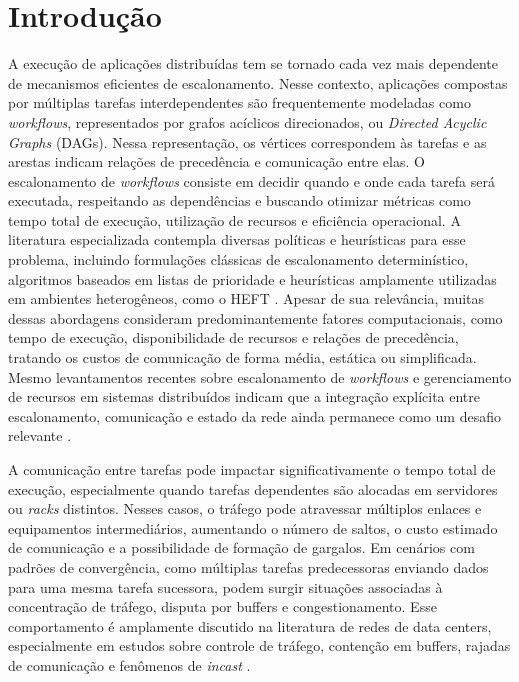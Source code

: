 \documentclass[12pt]{article}
\begin{document}
\section{Introdução}
\label{sec:introduction}

A execução de aplicações distribuídas tem se tornado cada vez mais dependente de mecanismos eficientes de escalonamento. 
%
Nesse contexto, aplicações compostas por múltiplas tarefas interdependentes são frequentemente modeladas como \textit{workflows}, representados por grafos acíclicos direcionados, ou \textit{Directed Acyclic Graphs} (DAGs). 
%
Nessa representação, os vértices correspondem às tarefas e as arestas indicam relações de precedência e comunicação entre elas. 
%
O escalonamento de \textit{workflows} consiste em decidir quando e onde cada tarefa será executada, respeitando as dependências e buscando otimizar métricas como tempo total de execução, utilização de recursos e eficiência operacional. 
%
A literatura especializada contempla diversas políticas e heurísticas para esse problema, incluindo formulações clássicas de escalonamento determinístico, algoritmos baseados em listas de prioridade e heurísticas amplamente utilizadas em ambientes heterogêneos, como o HEFT \cite{graham1979optimization,topcuoglu2002performance}.
%
Apesar de sua relevância, muitas dessas abordagens consideram predominantemente fatores computacionais, como tempo de execução, disponibilidade de recursos e relações de precedência, tratando os custos de comunicação de forma média, estática ou simplificada. 
%
Mesmo levantamentos recentes sobre escalonamento de \textit{workflows} e gerenciamento de recursos em sistemas distribuídos indicam que a integração explícita entre escalonamento, comunicação e estado da rede ainda permanece como um desafio relevante \cite{liu2020resource,saeedizade2025scientific}.

A comunicação entre tarefas pode impactar significativamente o tempo total de execução, especialmente quando tarefas dependentes são alocadas em servidores ou \textit{racks} distintos. 
%
Nesses casos, o tráfego pode atravessar múltiplos enlaces e equipamentos intermediários, aumentando o número de saltos, o custo estimado de comunicação e a possibilidade de formação de gargalos. 
%
Em cenários com padrões de convergência, como múltiplas tarefas predecessoras enviando dados para uma mesma tarefa sucessora, podem surgir situações associadas à concentração de tráfego, disputa por buffers e congestionamento. 
%
Esse comportamento é amplamente discutido na literatura de redes de data centers, especialmente em estudos sobre controle de tráfego, contenção em buffers, rajadas de comunicação e fenômenos de \textit{incast} \cite{noormohammadpour2017datacenter,li2021survey,ghabashneh2022microscopic,canel2024understanding}.
\end{document}
